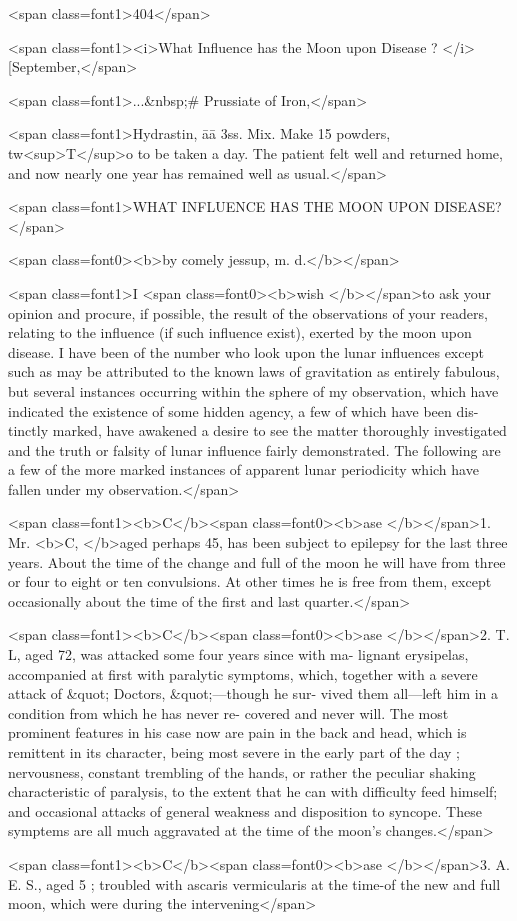 <span class=font1>404</span>

<span class=font1><i>What Influence has the Moon upon Disease ? </i>[September,</span>

<span class=font1>...&nbsp;#   Prussiate of Iron,</span>

<span class=font1>Hydrastin, āā 3ss.
Mix.   Make 15 powders, tw<sup>T</sup>o to be taken a day.   The patient felt
well and returned home, and now nearly one year has remained well as
usual.</span>

<span class=font1>WHAT INFLUENCE HAS THE MOON UPON DISEASE?</span>

<span class=font0><b>by comely jessup, m. d.</b></span>

<span class=font1>I <span class=font0><b>wish </b></span>to ask your opinion and procure, if possible, the result of the
observations of your readers, relating to the influence (if such influence
exist), exerted by the moon upon disease. I have been of the number
who look upon the lunar influences except such as may be attributed to
the known laws of gravitation as entirely fabulous, but several instances
occurring within the sphere of my observation, which have indicated
the existence of some hidden agency, a few of which have been dis-
tinctly marked, have awakened a desire to see the matter thoroughly
investigated and the truth or falsity of lunar influence fairly demonstrated.
The following are a few of the more marked instances of apparent lunar
periodicity which have fallen under my observation.</span>

<span class=font1><b>C</b><span class=font0><b>ase </b></span>1. Mr. <b>C, </b>aged perhaps 45, has been subject to epilepsy for
the last three years. About the time of the change and full of the
moon he will have from three or four to eight or ten convulsions. At
other times he is free from them, except occasionally about the time of
the first and last quarter.</span>

<span class=font1><b>C</b><span class=font0><b>ase </b></span>2. T. L, aged 72, was attacked some four years since with ma-
lignant erysipelas, accompanied at first with paralytic symptoms,
which, together with a severe attack of &quot; Doctors, &quot;—though he sur-
vived them all—left him in a condition from which he has never re-
covered and never will. The most prominent features in his case now
are pain in the back and head, which is remittent in its character,
being most severe in the early part of the day ; nervousness, constant
trembling of the hands, or rather the peculiar shaking characteristic of
paralysis, to the extent that he can with difficulty feed himself; and
occasional attacks of general weakness and disposition to syncope.
These symptems are all much aggravated at the time of the moon's
changes.</span>

<span class=font1><b>C</b><span class=font0><b>ase </b></span>3. A. E. S., aged 5 ; troubled with ascaris vermicularis at
the time-of the new and full moon, which were during the intervening</span>\endinput
